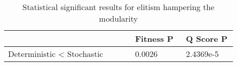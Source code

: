 \begin{table}[h]
	\centering
	\caption{Statistical significant results for elitism hampering the modularity}
	\label{table:4.11}
	\begin{tabular}{| p{0.5\linewidth}  | p{0.2\linewidth}  | p{0.2\linewidth}  |} 
		\hline
		& Fitness P & Q Score P \\
		\hline
		Deterministic < Stochastic & 0.0026 & 2.4369e-5 \\ 
		\hline
	\end{tabular}
\end{table}


